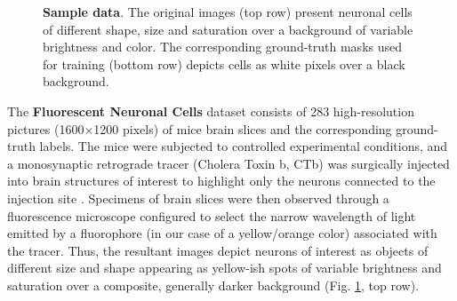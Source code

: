 \begin{figure}[ht]
\caption{
\textbf{Sample data}. The original images (top row) present neuronal cells of different shape, size and saturation over a background of variable brightness and color.
The corresponding ground-truth masks used for training (bottom row) depicts cells as white pixels over a black background.
} 
\label{fig:dataset}
\end{figure}

The \textbf{Fluorescent Neuronal Cells} dataset \cite{fluocells} consists of 283 high-resolution pictures (1600$\times$1200 pixels) of mice brain slices and the corresponding ground-truth labels.
The mice were subjected to controlled experimental conditions, and a monosynaptic retrograde tracer (Cholera Toxin b, CTb) was surgically injected into brain structures of interest to highlight only the neurons connected to the injection site
\cite{hitrec2019neural}.
Specimens of brain slices were then observed through  
a fluorescence microscope configured to select the narrow wavelength of light emitted by 
a fluorophore (in our case of a yellow/orange color) associated with the tracer.
Thus, the resultant images depict neurons of interest as objects of different size and shape appearing as yellow-ish spots of variable brightness and saturation over a composite, generally darker background (Fig. \ref{fig:dataset}, top row).


